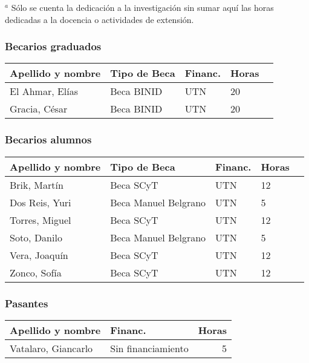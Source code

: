 \documentclass[a4paper,11pt,twoside,final,titlepage,onecolumn,openright]{report}
\begin{document}
\normalsize
\vspace{0.5cm}
$^a$ Sólo se cuenta la dedicación a la investigación sin sumar aquí las horas dedicadas a la docencia o actividades de extensión.

\subsubsection{Becarios graduados}

 \begin{tabular}{l l l l r}
 \toprule
 Apellido y nombre & Tipo de Beca & Financ. & Horas \\
 \midrule
 El Ahmar, Elías & Beca BINID & UTN & 20\\
 Gracia, César & Beca BINID & UTN & 20\\
 \bottomrule 
 \end{tabular}

\subsubsection{Becarios alumnos}

\begin{tabular}{l l l l r}
\toprule
Apellido y nombre & Tipo de Beca & Financ. & Horas \\
\midrule
Brik, Martín & Beca SCyT & UTN & 12 \\
Dos Reis, Yuri & Beca Manuel Belgrano & UTN & 5 \\
Torres, Miguel & Beca SCyT & UTN & 12 \\
Soto, Danilo & Beca Manuel Belgrano & UTN & 5 \\
Vera, Joaquín & Beca SCyT & UTN & 12 \\
Zonco, Sofía & Beca SCyT & UTN & 12 \\
\bottomrule 
\end{tabular}

 \subsubsection{Pasantes}
\begin{tabular}{l l r}
\toprule
Apellido y nombre & Financ. & Horas \\
\midrule
Vatalaro, Giancarlo & Sin financiamiento & 5\\
\bottomrule
\end{tabular}

\normalsize
\vspace{0.5cm}

\end{document}
